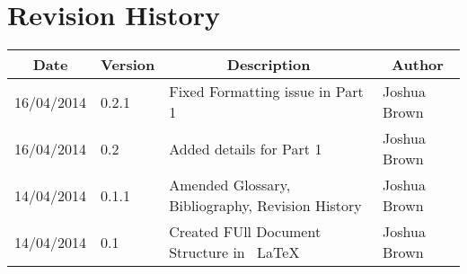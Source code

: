 
\chapter{Revision History} %

\label{AppendixA} %


\begin{table}[h]
\label{RevisionHistory}
\begin{tabular}{|l|l|l|l|}
\hline
\multicolumn{1}{|c}{\textbf{Date}} & \multicolumn{1}{|c}{\textbf{Version}} & \multicolumn{1}{|c}{\textbf{Description}}        & \multicolumn{1}{|c|}{\textbf{Author}} \\ \hline

	16/04/2014	& 0.2.1		& Fixed Formatting issue in Part 1					& Joshua Brown				\\ \hline
	16/04/2014	& 0.2		& Added details for Part 1	& Joshua Brown				\\ \hline
	14/04/2014	& 0.1.1 	& Amended Glossary, Bibliography, Revision History 					& Joshua Brown			 	\\ \hline
	14/04/2014	& 0.1		& Created FUll Document Structure in ~\LaTeX							& Joshua Brown 				\\ \hline
	\end{tabular}
\end{table}